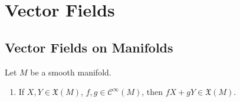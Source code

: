 \chapter{Vector Fields}
\section{Vector Fields on Manifolds}

\begin{exercise}
	Let $M$ be a smooth manifold. 
	\begin{enumerate}[label = (\alph*)]
		\item If $X,Y \in \mathfrak{X}(M)$, $f,g \in \mathscr{C}^\infty(M)$, then $fX + gY \in \mathfrak{X}(M)$.
	\end{enumerate}
\end{exercise}
